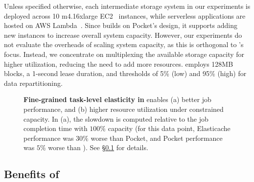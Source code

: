  Unless specified otherwise, each intermediate storage system in our experiments is deployed across 10 m4.16xlarge EC2~\cite{ec2} instances, while serverless applications are hosted on AWS Lambda~\cite{ec2}. Since \jiffy builds on Pocket's design, it supports adding new instances to increase overall system capacity. However, our experiments do not evaluate the overheads of scaling system capacity, as this is orthogonal to \jiffy’s focus. Instead, we concentrate on multiplexing the available storage capacity for higher utilization, reducing the need to add more resources. \jiffy employs 128MB blocks, a 1-second lease duration, and thresholds of 5\% (low) and 95\% (high) for data repartitioning.

\begin{figure}[t]
  \centering
  \caption[Fine-grained task-level elasticity in \jiffy]{\textbf{Fine-grained task-level elasticity in \jiffy} enables (a) better job performance, and (b) higher resource utilization under constrained capacity. In (a), the slowdown is computed relative to the job completion time with $100\%$ capacity (for this data point, Elasticache performance was $30\%$ worse than Pocket, and Pocket performance was $5\%$ worse than \jiffy). See \S\ref{ssec:overallbenefits} for details.}
  \label{fig:elasticity}\vspace{-1.25em}
\end{figure}


\subsection{Benefits of \jiffy}
\label{ssec:overallbenefits}

